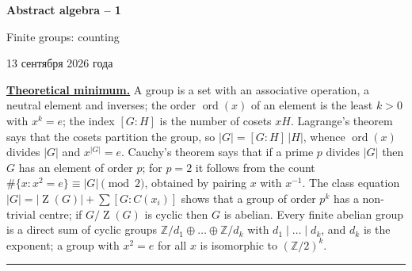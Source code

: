 \documentclass[11pt,a4paper]{article}
\newcommand{\head}[1]{\par\medskip\noindent\textbf{\underline{#1}}\quad}
\newcommand{\sheettitle}[3]{%
  \begin{center}
  {\huge\bfseries #1\par}\vspace{1.2em}
  {\Large #2\par}\vspace{0.8em}
  \if\relax\detokenize{#3}\relax\else{\Large #3\par}\vspace{0.8em}\fi
  {\foreignlanguage{russian}{13 сентября 2026 года}\par}
  \end{center}\vspace{0.5em}}
\newcommand{\Z}{\mathbb Z}
\DeclareMathOperator{\ZZ}{Z}
\DeclareMathOperator{\ord}{ord}
\begin{document}
\sheettitle{Abstract algebra -- 1}{Finite groups: counting}{Homework}

\head{Theoretical minimum.} A group is a set with an associative operation, a neutral element
and inverses; the order $\ord(x)$ of an element is the least $k>0$ with $x^k=e$; the index
$[G:H]$ is the number of cosets $xH$. Lagrange's theorem says that the cosets partition the
group, so $|G|=[G:H]\,|H|$, whence $\ord(x)$ divides $|G|$ and $x^{|G|}=e$. Cauchy's theorem
says that if a prime $p$ divides $|G|$ then $G$ has an element of order $p$; for $p=2$ it
follows from the count $\#\{x:x^2=e\}\equiv|G|\pmod 2$, obtained by pairing $x$ with $x^{-1}$.
The class equation $|G|=|\ZZ(G)|+\sum[G:C(x_i)]$ shows that a group of order $p^k$ has a
non-trivial centre; if $G/\ZZ(G)$ is cyclic then $G$ is abelian. Every finite abelian group is
a direct sum of cyclic groups $\Z/d_1\oplus\dots\oplus\Z/d_k$ with $d_1\mid\dots\mid d_k$, and
$d_k$ is the exponent; a group with $x^2=e$ for all $x$ is isomorphic to $(\Z/2)^k$.

\medskip\noindent\rule{\linewidth}{0.4pt}
\end{document}
